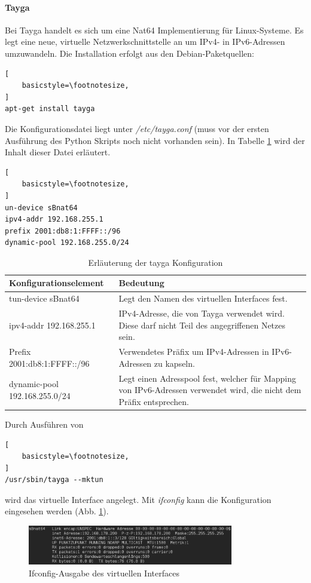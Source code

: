 \FloatBarrier

\paragraph*{Tayga}
Bei Tayga handelt es sich um eine Nat64 Implementierung für Linux-Systeme. Es legt eine neue, virtuelle Netzwerkschnittstelle an um IPv4- in IPv6-Adressen umzuwandeln. Die Installation erfolgt aus den Debian-Paketquellen:
\lstset{language=bash}
\begin{lstlisting}[
	basicstyle=\footnotesize,
]
apt-get install tayga
\end{lstlisting}


Die Konfigurationsdatei liegt unter \textit{/etc/tayga.conf} (muss vor der ersten Ausführung des Python Skripts noch nicht vorhanden sein). In Tabelle \ref{tab:taygaConfig} wird der Inhalt dieser Datei erläutert.
\begin{lstlisting}[
	basicstyle=\footnotesize,
]
un-device sBnat64
ipv4-addr 192.168.255.1
prefix 2001:db8:1:FFFF::/96
dynamic-pool 192.168.255.0/24
\end{lstlisting}

\begin{table}
	\centering
		\begin{tabular}{lp{9cm}}
			Konfigurationselement & Bedeutung \\ \hline
			tun-device sBnat64 & Legt den Namen des virtuellen Interfaces fest. \\
			ipv4-addr 192.168.255.1 & IPv4-Adresse, die von Tayga verwendet wird. Diese darf nicht Teil des angegriffenen Netzes sein. \\
			Prefix 2001:db8:1:FFFF::/96 & Verwendetes Präfix um IPv4-Adressen in IPv6-Adressen zu kapseln. \\
			dynamic-pool 192.168.255.0/24 & Legt einen Adresspool fest, welcher für Mapping von IPv6-Adressen verwendet wird, die nicht dem Präfix entsprechen. \\
		\end{tabular}
	\caption{Erläuterung der tayga Konfiguration}
	\label{tab:taygaConfig}
\end{table}

\FloatBarrier

Durch Ausführen von 
\lstset{language=bash}
\begin{lstlisting}[
	basicstyle=\footnotesize,
]
/usr/sbin/tayga --mktun
\end{lstlisting}

wird das virtuelle Interface angelegt. Mit \textit{ifconfig} kann die Konfiguration eingesehen werden (Abb. \ref{fig:tunInterface}). 
\begin{figure}[h!]
	\centering
	\includegraphics[width=0.80\textwidth]{bilder/fakeIPv6/tunInterface.pdf}
	\caption{Ifconfig-Ausgabe des virtuellen Interfaces}
	\label{fig:tunInterface}
\end{figure}



